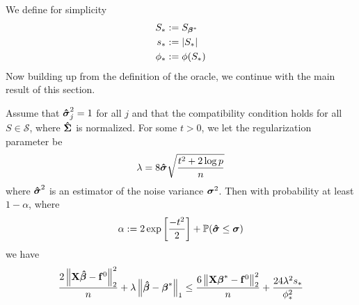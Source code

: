 We define for simplicity
\begin{align*}
    S_*    & := S_{\boldsymbol{\beta}^*} \\
    s_*    & := |S_*|      \\
    \phi_* & := \phi(S_*)  \\
\end{align*}
Now building up from the definition of the oracle, we continue with the main result of this section.
\begin{theorem}
    \label{theorem: theorem 6.2}
    Assume that \(\boldsymbol{\hat{\sigma}}_{j}^{2}=1\) for all \(j\) and that the compatibility condition holds for all \(S \in \mathscr{S}\), where \(\boldsymbol{\hat{\Sigma}}\) is normalized. For some \(t>0\), we let the regularization parameter be
    \[
        \lambda=8 \boldsymbol{\hat{\sigma}} \sqrt{\frac{t^{2} + 2 \log p}{n}}
    \]
    where \(\boldsymbol{\hat{\sigma}}^{2}\) is an estimator of the noise variance \(\boldsymbol{\sigma}^{2}\). Then with probability at least \(1-\alpha\), where
    \[
        \alpha := 2 \exp \left[ \frac{-t^{2}}{2} \right] + \mathbb{P}(\boldsymbol{\hat{\sigma}} \leq \boldsymbol{\sigma})
    \]
    we have
    \[
        \frac{2\left\|\mathbf{X} \boldsymbol{\hat{\beta}}-\mathbf{f}^{0}\right\|_{2}^{2}}{n} +  \lambda\left\|\boldsymbol{\hat{\beta}}-\boldsymbol{\beta}^{*}\right\|_{1} \leq \frac{6 \left\|\mathbf{X} \boldsymbol{\beta}^{*} - \mathbf{f}^{0}\right\|_{2}^{2}}{n} + \frac{24 \lambda^{2} s_{*}}{\phi_{*}^{2}}
    \]
\end{theorem}
